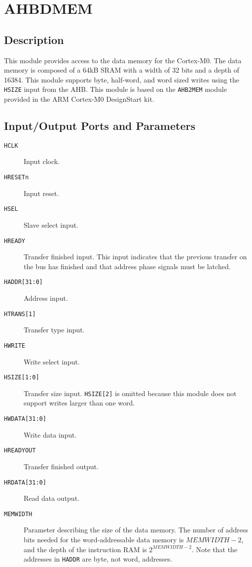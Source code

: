 \section{AHBDMEM}
\subsection{Description}
This module provides access to the data memory for the Cortex-M0. The data memory is composed of a 64kB SRAM with a width of 32 bits and a depth of 16384. This module supports byte, half-word, and word sized writes using the \texttt{HSIZE} input from the AHB. This module is based on the \texttt{AHB2MEM} module provided in the ARM Cortex-M0 DesignStart kit.

\subsection{Input/Output Ports and Parameters}
\begin{description}
	\item[\texttt{HCLK}] Input clock.
	\item[\texttt{HRESETn}] Input reset.
	\item[\texttt{HSEL}] Slave select input.
	\item[\texttt{HREADY}] Transfer finished input. This input indicates that the previous transfer on the bus has finished and that address phase signals must be latched.
	\item[\texttt{HADDR[31:0]}] Address input.
	\item[\texttt{HTRANS[1]}] Transfer type input.
	\item[\texttt{HWRITE}] Write select input.
	\item[\texttt{HSIZE[1:0]}] Transfer size input. \texttt{HSIZE[2]} is omitted because this module does not support writes larger than one word.
	\item[\texttt{HWDATA[31:0]}] Write data input.
	\item[\texttt{HREADYOUT}] Transfer finished output.
	\item[\texttt{HRDATA[31:0]}] Read data output.
	\item[\texttt{MEMWIDTH}] Parameter describing the size of the data memory. The number of address bits needed for the word-addressable data memory is $MEMWIDTH-2$, and the depth of the instruction RAM is $2^{MEMWIDTH-2}$. Note that the addresses in \texttt{HADDR} are byte, not word, addresses.
\end{description}

